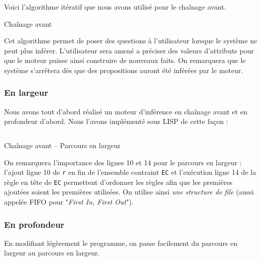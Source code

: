 \documentclass[a4paper,12pt]{article}
\begin{document}
Voici l'algorithme itératif que nous avons utilisé pour le chaînage avant.
\begin{algorithm}

\caption{Chaînage avant \label{algoChainageAvant}}
\end{algorithm}

Cet algorithme permet de poser des questions à l'utilisateur lorsque le système ne peut plus inférer. L'utilisateur sera amené a préciser des valeurs d'attributs pour que le moteur puisse ainsi construire de nouveaux faits. On remarquera que le système s'arrêtera dès que des propositions auront été inférées par le moteur.

\newpage
\subsubsection{En largeur}

	Nous avons tout d'abord réalisé un moteur d'inférence en chaînage avant et en profondeur d'abord. Nous l'avons implémenté sous LISP de cette façon :

\begin{listing}[H]
	\centering
	\inputminted[breaklines=true,linenos]{lisp}{../chainageAvantLarg.lisp}
	\caption{Chaînage avant -- Parcours en largeur}
\end{listing}

On remarquera l'importance des lignes 10 et 14 pour le parcours en largeur : l'ajout ligne 10 de \texttt{r} en fin de l'ensemble contraint \texttt{EC} et l'exécution ligne 14 de la règle en tête de \texttt{EC} permettent d'ordonner les règles afin que les premières ajoutées soient les premières utilisées. On utilise ainsi \textit{une structure de file} (aussi appelée FIFO pour "\textit{First In, First Out}").

\newpage
\subsubsection{En profondeur}

En modifiant légèrement le programme, on passe facilement du parcours en largeur au parcours en largeur.
\end{document}
